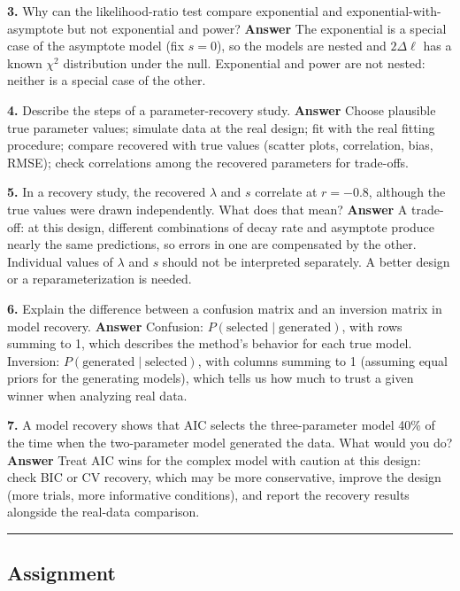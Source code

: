 \textbf{3.} Why can the likelihood-ratio test compare exponential and
exponential-with-asymptote but not exponential and power?
\textbf{Answer} The exponential is a special case of the asymptote model
(fix \(s = 0\)), so the models are nested and \(2\Delta\ell\) has a
known \(\chi^2\) distribution under the null. Exponential and power are
not nested: neither is a special case of the other.

\textbf{4.} Describe the steps of a parameter-recovery study.
\textbf{Answer} Choose plausible true parameter values; simulate data at
the real design; fit with the real fitting procedure; compare recovered
with true values (scatter plots, correlation, bias, RMSE); check
correlations among the recovered parameters for trade-offs.

\textbf{5.} In a recovery study, the recovered \(\lambda\) and \(s\)
correlate at \(r = -0.8\), although the true values were drawn
independently. What does that mean? \textbf{Answer} A trade-off: at this
design, different combinations of decay rate and asymptote produce
nearly the same predictions, so errors in one are compensated by the
other. Individual values of \(\lambda\) and \(s\) should not be
interpreted separately. A better design or a reparameterization is
needed.

\textbf{6.} Explain the difference between a confusion matrix and an
inversion matrix in model recovery. \textbf{Answer} Confusion:
\(P(\text{selected} \mid \text{generated})\), with rows summing to 1,
which describes the method's behavior for each true model. Inversion:
\(P(\text{generated} \mid \text{selected})\), with columns summing to 1
(assuming equal priors for the generating models), which tells us how
much to trust a given winner when analyzing real data.

\textbf{7.} A model recovery shows that AIC selects the three-parameter
model 40\% of the time when the two-parameter model generated the data.
What would you do? \textbf{Answer} Treat AIC wins for the complex model
with caution at this design: check BIC or CV recovery, which may be more
conservative, improve the design (more trials, more informative
conditions), and report the recovery results alongside the real-data
comparison.

\begin{center}\rule{0.5\linewidth}{0.5pt}\end{center}


\subsection{Assignment}

